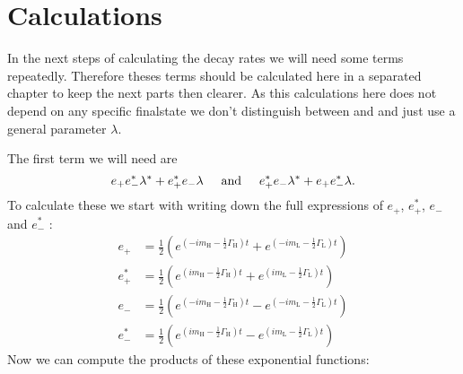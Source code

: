 \section{Calculations}

In the next steps of calculating the decay rates we will need some terms repeatedly. Therefore theses terms should be calculated here in a separated chapter
to keep the next parts then clearer. As this calculations here does not depend on any specific finalstate we don't distinguish between \Lf and
\Lfbar and just use a general parameter $\lambda$.

The first term we will need are
\begin{equation}
    e_{+}e_{-}^*\lambda^{\ast}+e_+^*e_-\lambda \hspace{0.5cm} \text{and} \hspace{0.5cm} e_{+}^*e_{-}\lambda^{\ast}+e_+e_-^*\lambda.
\end{equation}
To calculate these we start with writing down the full expressions of $e_+$, $e_+^*$, $e_-$ and $e_-^*$ :
\begin{align}
  e_+ &= \frac{1}{2}\left(e^{\left(-im_{\text{H}}-\frac{1}{2}\Gamma_{\text{H}}\right)t}+e^{\left(-im_{\text{L}}-\frac{1}{2}\Gamma_{\text{L}}\right)t}\right)\\
  e_+^* &= \frac{1}{2}\left(e^{\left(im_{\text{H}}-\frac{1}{2}\Gamma_{\text{H}}\right)t}+e^{\left(im_{\text{L}}-\frac{1}{2}\Gamma_{\text{L}}\right)t}\right)\\
  e_- &= \frac{1}{2}\left(e^{\left(-im_{\text{H}}-\frac{1}{2}\Gamma_{\text{H}}\right)t}-e^{\left(-im_{\text{L}}-\frac{1}{2}\Gamma_{\text{L}}\right)t}\right)\\
  e_-^* &= \frac{1}{2}\left(e^{\left(im_{\text{H}}-\frac{1}{2}\Gamma_{\text{H}}\right)t}-e^{\left(im_{\text{L}}-\frac{1}{2}\Gamma_{\text{L}}\right)t}\right)
\end{align}
Now we can compute the products of these exponential functions:
